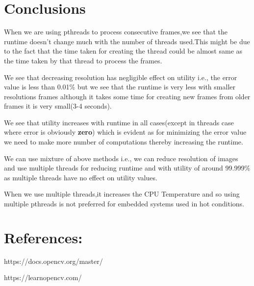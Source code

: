\documentclass[12pt]{article}
\begin{document}
 \section{Conclusions}
 \begin{itemize}
\normalsize{

\item When we are using pthreads to process consecutive frames,we see that the runtime doesn't change much with the number of threads used.This might be due to the fact that the time taken for creating the thread could be almost same as the time taken by that thread to process the frames.

\item We see that decreasing resolution has negligible effect on utility i.e., the error value is less than 0.01\% but we see that the runtime is very less with smaller resolutions frames although it takes some time for creating new frames from older frames it is very small(3-4 seconds).

\item We see that utility increases with runtime in all cases(except in threads case where error is obviously \textbf{zero}) which is evident as for minimizing the error value we need to make more number of computations thereby increasing the runtime.

\item We can use mixture of above methods i.e., we can reduce resolution of images and use multiple threads for reducing runtime and with utility of around 99.999\% as multiple threads have no effect on utility values.

\item When we use multiple threads,it increases the CPU Temperature and so using multiple pthreads is not preferred for embedded systems used in hot conditions.
}
 
\end{itemize}

\section{References:}
\begin{enumerate}
   \normalsize{
    \item https://docs.opencv.org/master/
    \item https://learnopencv.com/
    }
\end{enumerate}
\end{document}
